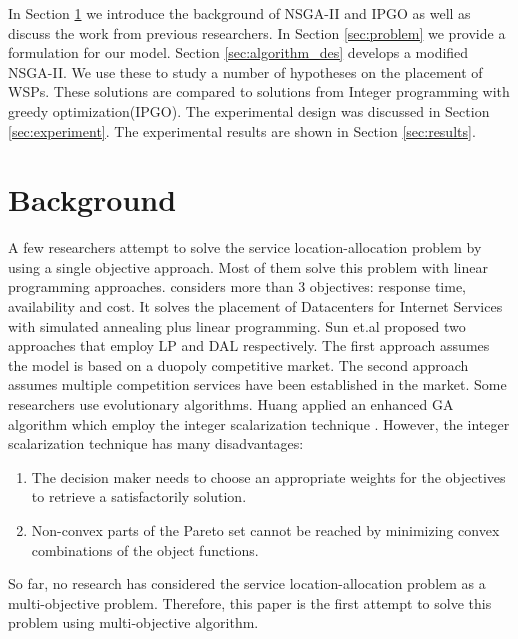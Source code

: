\documentclass{llncs}
\begin{document}
In Section \ref{sec:Background} we introduce the background of NSGA-II and IPGO as well as discuss the work from previous researchers.
In Section \ref{sec:problem} we provide a formulation for our model. Section \ref{sec:algorithm_des} develops a modified NSGA-II. 
We use these to study a number of hypotheses on the placement of WSPs. These solutions are compared to solutions from Integer
programming with greedy optimization(IPGO). 
The experimental design was discussed in Section \ref{sec:experiment}. The experimental results are shown in Section \ref{sec:results}.


\section{Background}
\label{sec:Background}
A few researchers attempt to solve the service location-allocation problem by using a single objective approach. Most of them solve this problem with linear programming approaches.
\cite{5961695} considers more than 3 objectives: response time, availability and cost. 
It solves the placement of Datacenters for Internet Services with simulated annealing plus linear programming. 
Sun et.al proposed two approaches \cite{Aboolian} \cite{Sun} that employ LP and DAL respectively. 
The first approach \cite{Aboolian} assumes the model is based on a duopoly competitive market.
The second approach \cite{Sun} assumes multiple competition services have been established in the market.
Some researchers use evolutionary algorithms. Huang \cite{EnhancedGenetic} applied an enhanced GA algorithm which employ the integer scalarization technique \cite{Multiobjective}. However, 
the integer scalarization technique has many disadvantages:
\begin{enumerate}
	\item The decision maker needs to choose an appropriate weights for the objectives to retrieve a satisfactorily solution.
	\item Non-convex parts of the Pareto set cannot be reached by minimizing convex combinations of the object functions.
\end{enumerate}

So far, no research has considered the service location-allocation problem as a multi-objective problem. Therefore, this paper is the first attempt to solve this problem using 
multi-objective algorithm.
\end{document}
